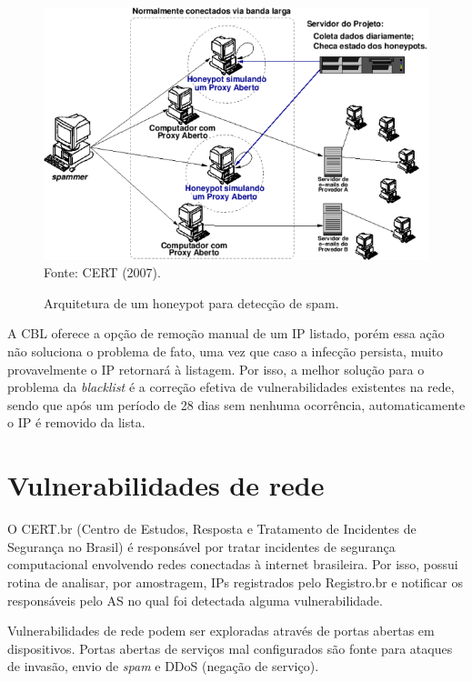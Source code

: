     \begin{figure}[!htb]
        \centering
        \caption{Arquitetura de um honeypot para detecção de spam.} 
        \label{fig:honeypot} 
        \includegraphics[scale=0.8]{img/honeypot.png} \\
        {\small Fonte: CERT (2007).} 
    \end{figure}
    
    A CBL oferece a opção de remoção manual de um IP listado, porém essa ação não soluciona o problema de fato, uma vez que caso a infecção persista, muito provavelmente o IP retornará à listagem. Por isso, a melhor solução para o problema da \textit{blacklist} é a correção efetiva de vulnerabilidades existentes na rede, sendo que após um período de 28 dias sem nenhuma ocorrência, automaticamente o IP é removido da lista.

\section{Vulnerabilidades de rede}

    O CERT.br (Centro de Estudos, Resposta e Tratamento de Incidentes de Segurança no Brasil) é responsável por tratar incidentes de segurança computacional envolvendo redes conectadas à internet brasileira. Por isso, possui rotina de analisar, por amostragem, IPs registrados pelo Registro.br e notificar os responsáveis pelo AS no qual foi detectada alguma vulnerabilidade.
    
    Vulnerabilidades de rede podem ser exploradas através de portas abertas em dispositivos. Portas abertas de serviços mal configurados são fonte para ataques de invasão, envio de \textit{spam} e DDoS (negação de serviço).
    
